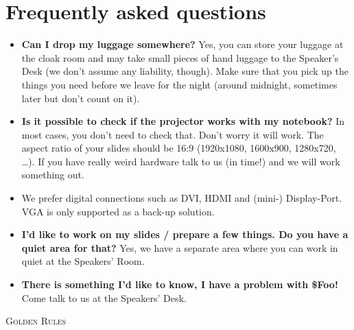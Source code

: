 \documentclass[paper=a4]{scrartcl}
\begin{document}
	\section*{Frequently asked questions}
	\begin{itemize}
		\item \textbf{Can I drop my luggage somewhere?} Yes, you can store your luggage at the cloak room and may take small pieces of hand luggage to the Speaker's Desk (we don't assume any liability, though). Make sure that you pick up the things you need before we leave for the night (around midnight, sometimes later but don't count on it).
		\item \textbf{Is it possible to check if the projector works with my notebook?} In most cases, you don't need to check that. Don't worry it will work. The aspect ratio of your slides should be 16:9 (1920x1080, 1600x900, 1280x720, \ldots). If you have really weird hardware talk to us (in time!) and we will work something out.
		\item We prefer digital connections such as DVI, HDMI and (mini-) Display-Port. VGA is only supported as a back-up solution. 
		\item \textbf{I'd like to work on my slides / prepare a few things. Do you have a quiet area for that?} Yes, we have a separate area where you can work in quiet at the Speakers' Room.
		\item \textbf{There is something I'd like to know, I have a problem with \$Foo!} Come talk to us at the Speakers' Desk.
	\end{itemize}
\newpage
\begin{center} \textsc{\Huge Golden Rules}\end{center}
\end{document}
